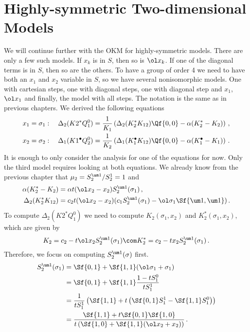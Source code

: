 
\chapter{Highly-symmetric Two-dimensional Models}
We will continue further with the OKM for highly-symmetric models. There are only a few such models. If $x_k$ is in $S$, then so is $\ol x_k$. If one of the diagonal terms is in $S$, then so are the others. To have a group of order 4 we need to have both an $x_1$ and $x_2$ variable in $S$, so we have several nonisomorphic models. One with cartesian steps, one with diagonal steps, one with diagonal step and $x_1$,$\ol x_1$ and finally, the model with all steps. The notation is the same as in previous chapters. We derived the following equations
\begin{align}
	x_1 = \sigma_1:\quad\Delta_2(K2^\ast Q_1^0) &=\frac{1}{K_1} \left(\Delta_2(K_2^\ast K_{12})\Qf{0,0} - \alpha(K_2^\ast-K_2)\right)\,,\\
	x_2 = \sigma_2:\quad\Delta_1(K1^\bullet Q_2^0) &=\frac{1}{K_2} \left(\Delta_1(K_1^\bullet K_{12})\Qf{0,0} - \alpha(K_1^\bullet-K_1)\right)\,.
\end{align}
It is enough to only consider the analysis for one of the equations for now. Only the third model requires looking at both equations. We already know from the previous chapter that $\mu_2 = S_2^{\um 1}/S_2^1 = 1$ and 
\begin{align}
	\alpha(K_2^\ast -K_2)  &= \alpha t(\ol x_2 - x_2)S_2^{\um 1}(\sigma_1)\,,\\
	\Delta_2(K_2^\ast K_{12}) &= c_2t(\ol x_2-x_2)(c_1S_2^{\um 1}(\sigma_1) - \ol \sigma_1\Sf{\um 1,\um 1})\,.
\end{align}
To compute $\Delta_2(K2^\ast Q_1^0)$ we need to compute $K_2(\sigma_1,x_2)$ and $K_2^\ast(\sigma_1,x_2)$, which are given by
\begin{align}
	K_2 = c_2 -t\ol x_2S_2^{\um 1}(\sigma_1) \com K_2^\ast = c_2 -t x_2S_2^{\um 1}(\sigma_1)\,.
\end{align}
Therefore, we focus on computing $S_2^{\um 1}(\sigma)$ first.
\begin{align}
\begin{split}
	S_2^{\um 1}(\sigma_1) &= \Sf{0,1}+ \Sf{1,1}(\ol \sigma_1+\sigma_1)\\
	&= \Sf{0,1} + \Sf{1,1}\frac{1-tS_1^0}{t S_1^1}\\
	&= \frac{1}{tS_1^1}\left(\Sf{1,1}+t\left(\Sf{0,1}S_1^1-\Sf{1,1}S_1^0\right)\right)\\
	&= \frac{\Sf{1,1}+t\Sf{0,1}\Sf{1,0}}{t\left(\Sf{1,0}+\Sf{1,1}(\ol x_2+x_2)\right)}\,.
\end{split}
\end{align}
